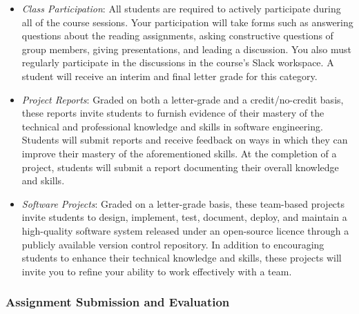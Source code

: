 \documentclass[11pt]{article}
\begin{document}
\begin{itemize}

  \item {\em Class Participation\/}: All students are required to actively
    participate during all of the course sessions. Your participation will take
    forms such as answering questions about the reading assignments, asking
    constructive questions of group members, giving presentations, and leading a
    discussion. You also must regularly participate in the discussions in the
    course's Slack workspace. A student will receive an interim and final letter
    grade for this category.

  \item {\em Project Reports\/}: Graded on both a letter-grade and a
    credit/no-credit basis, these reports invite students to furnish evidence of
    their mastery of the technical and professional knowledge and skills in
    software engineering. Students will submit reports and receive feedback on
    ways in which they can improve their mastery of the aforementioned skills.
    At the completion of a project, students will submit a report documenting
    their overall knowledge and skills.

  \item {\em Software Projects\/}: Graded on a letter-grade basis, these
    team-based projects invite students to design, implement, test, document,
    deploy, and maintain a high-quality software system released under an
    open-source licence through a publicly available version control repository.
    In addition to encouraging students to enhance their technical knowledge and
    skills, these projects will invite you to refine your ability to work
    effectively with a team.

\end{itemize}

\subsubsection*{Assignment Submission and Evaluation}
\end{document}
